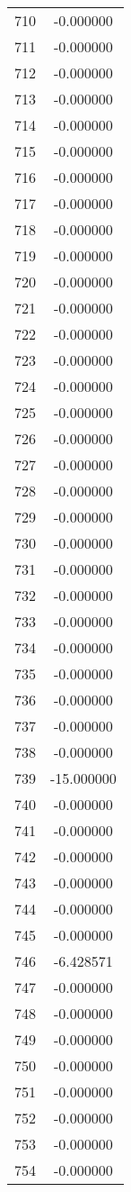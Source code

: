 \documentclass[12pt]{article}
\begin{document}
\begin{longtable}{@{}cc@{}}
710 & -0.000000 \\
711 & -0.000000 \\
712 & -0.000000 \\
713 & -0.000000 \\
714 & -0.000000 \\
715 & -0.000000 \\
716 & -0.000000 \\
717 & -0.000000 \\
718 & -0.000000 \\
719 & -0.000000 \\
720 & -0.000000 \\
721 & -0.000000 \\
722 & -0.000000 \\
723 & -0.000000 \\
724 & -0.000000 \\
725 & -0.000000 \\
726 & -0.000000 \\
727 & -0.000000 \\
728 & -0.000000 \\
729 & -0.000000 \\
730 & -0.000000 \\
731 & -0.000000 \\
732 & -0.000000 \\
733 & -0.000000 \\
734 & -0.000000 \\
735 & -0.000000 \\
736 & -0.000000 \\
737 & -0.000000 \\
738 & -0.000000 \\
739 & -15.000000 \\
740 & -0.000000 \\
741 & -0.000000 \\
742 & -0.000000 \\
743 & -0.000000 \\
744 & -0.000000 \\
745 & -0.000000 \\
746 & -6.428571 \\
747 & -0.000000 \\
748 & -0.000000 \\
749 & -0.000000 \\
750 & -0.000000 \\
751 & -0.000000 \\
752 & -0.000000 \\
753 & -0.000000 \\
754 & -0.000000 \\

\end{longtable}
\end{document}
